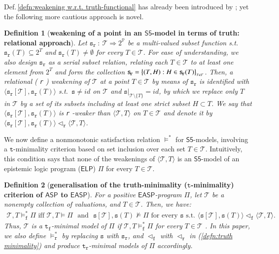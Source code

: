 \documentclass[submission,copyright,creativecommons]{eptcs}
\newcommand{\tuple}[1]  { \langle #1 \rangle }
\newcommand{\Prop}  { \mathbb{P} }
\newcommand\restr[2]  { \ensuremath{\left.#1\right|_{#2}} }
\newcommand{\suchthat}  { \ : \ }
\newcommand{\set}[1]  { \{ #1 \} }
\newcommand{\bigset}[1]  { \big\{ #1 \big\} }
\newcommand{\logic}[1]  { \ensuremath{\mathsf{#1}} }
\newcommand{\sfive}  { \logic{S5} }
\newcommand{\ASP}  { \logic{ASP} }
\newcommand{\EASP}  { \logic{EASP} }
\newcommand{\ELP}  { \logic{ELP} }
\newcommand{\epispec}  { \Pi }
\newcommand{\weak}  { \texttt{s} }
\newcommand{\functional}  { \texttt{f} }
\newcommand{\relational}  { \texttt{r} }
\newcommand{\weakrelational}  { \weak_{\!\relational} }
\newcommand{\tfunctional}  { \texttt{t}_{\!\functional} }
\newcommand{\trelational}  { \texttt{t}_{\!\relational} }
\newcommand{\starmodels}  { \models^* }
\newtheorem{definition}{Definition}
\begin{document}
Def.\,\ref{defn:weakening w.r.t. truth-functional} has already been introduced by \cite{Su19jelia}; yet the following more cautious approach is novel.
%
\begin{definition}[\textbf{weakening of a point in an $\sfive$-model
in terms of truth: relational approach}]
\label{defn:weakening w.r.t. truth-relational} \normalfont
Let $\weakrelational \suchthat \mathcal T \Rightarrow 2^{\Prop}$ 
be a multi-valued \emph{subset} function s.t.\ 
$\weakrelational(T) \subseteq 2^T$ and
$\weakrelational(T) \neq \emptyset$ for every $T \in \mathcal T$. 
For ease of understanding,
we also design $\weakrelational$ as a serial subset relation, 
relating each $T \in \mathcal T$ to at least one element from $2^T$ 
and form the collection
$\weakrelational=\bigset{(T,H) :H \in \weakrelational(T)}_%
{\scriptscriptstyle{T\in \mathcal T}}$. 
Then, a \emph{relational (\relational) weakening} of $\mathcal T$ 
at a point $T \in \mathcal T$ by means of $\weakrelational$ is identified
with $\tuple{\weakrelational[\mathcal T], \weakrelational(T)}$
s.t.\ $\weak \neq id$ on $\mathcal T$ and
$\restr{\weak}{ \mathcal T \setminus \set T}= id$, by which we replace only
$T$ in $\mathcal T$ by a set of its subsets including 
at least one strict subset $H \subset T$.
We say that $\tuple{\weakrelational[\mathcal T], \weakrelational(T)}$ 
is \emph{\relational-weaker} than $\tuple{\mathcal T, T}$
on $T \in \mathcal T$ and denote it by $\tuple{\weakrelational[\mathcal T], \weakrelational(T)} \lhd_{\relational} \tuple{\mathcal T, T}$.
\end{definition}

We now define a nonmonotonic satisfaction relation 
$\starmodels$ for $\sfive$-models, involving
a $\texttt{t}$-minimality criterion based on set inclusion
over each set $T \in \mathcal T$.
Intuitively, this condition says that
none of the weakenings of $\tuple{\mathcal T,T}$ is an $\sfive$-model
of an epistemic logic program ($\ELP$) $\epispec$ for every $T \in \mathcal T$.
%
\begin{definition} [\textbf{generalisation of the truth-minimality ($\texttt{t}$-minimality) criterion of $\ASP$ to $\EASP$}]
\normalfont
For a positive $\EASP$-program $\epispec$,
let $\mathcal T$ be a nonempty collection of valuations, and $T \in \mathcal T$.
Then, we have:
\begin{align}
\label{defn:truth minimality}
\mathcal T, T \starmodels_{\!\functional} \epispec \text{ \ \ iff \ \ }
\mathcal T, T \models \epispec \text{ ~and~ }
\weak[\mathcal T], \weak(T) \not\models \epispec
\text{ for every }  \weak  \text{ s.t.\ } 
\tuple{\weak[\mathcal T], \weak(T)} \lhd_{\functional} \tuple{\mathcal T, T}.
\end{align}
Thus, $\mathcal T$ is a \emph{$\tfunctional$-minimal} model of $\epispec$ if
$\mathcal T, T \starmodels_{\!\functional} \epispec$ for every $T \in \mathcal T$
\cite{Su19jelia}. In this paper, we also define
$\starmodels_{\!\relational}$ by replacing $\weak$ with $\weakrelational$, and
$\lhd_{\functional}$ with $\lhd_{\relational}$ 
in (\ref{defn:truth minimality}) and produce 
\emph{$\trelational$-minimal} models of $\epispec$ accordingly.
\end{definition}
\end{document}
